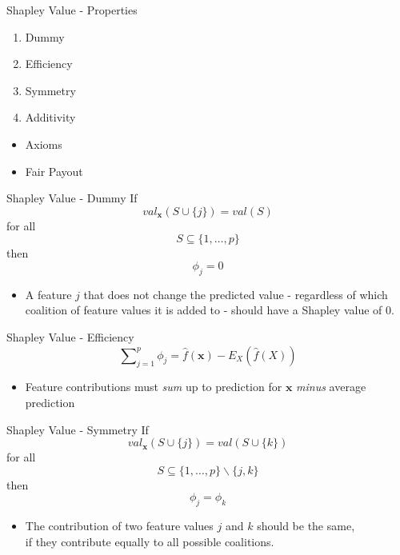 \begin{frame}{Shapley Value - Properties}
	\begin{enumerate}
		\item Dummy
		\item Efficiency
		\item Symmetry
		\item Additivity
	\end{enumerate}
	\begin{itemize}
		\item Axioms
		\item Fair Payout
	\end{itemize}
\end{frame}
\begin{frame}{Shapley Value - Dummy}
	If
	\begin{equation}
		val_{\bm{x}}(S\cup\{j\})=val(S)
	\end{equation}
	for all
	\begin{equation*}
		S\subseteq\{1,\ldots,p\}
	\end{equation*}
	then
	\begin{equation*}
		\phi_j=0
	\end{equation*}
	\begin{itemize}
		\item A feature $j$ that does not change the predicted value - regardless of which coalition of feature values it is added to - should have a Shapley value of 0.
	\end{itemize}
\end{frame}
\begin{frame}{Shapley Value - Efficiency}
	\begin{equation}
		\sum\nolimits_{j=1}^p\phi_j=\hat{f}(\bm{x})-E_X(\hat{f}(X))
	\end{equation}
	\begin{itemize}
		\item Feature contributions must \emph{sum} up to prediction for $\bm{x}$ \emph{minus} average prediction
	\end{itemize}
\end{frame}
\begin{frame}{Shapley Value - Symmetry}
	If
	\begin{equation}
		val_{\bm{x}}(S \cup \{j\})=val(S\cup\{k\})
	\end{equation}
	for all
	\begin{equation*}
		S\subseteq\{1,\ldots, p\} \backslash \{j,k\}
	\end{equation*}
	then
	\begin{equation*}
		\phi_j=\phi_k
	\end{equation*}
	\begin{itemize}
		\item The contribution of two feature values $j$ and $k$ should be the same, 
		\\if they contribute equally to all possible coalitions.
	\end{itemize}
\end{frame}
